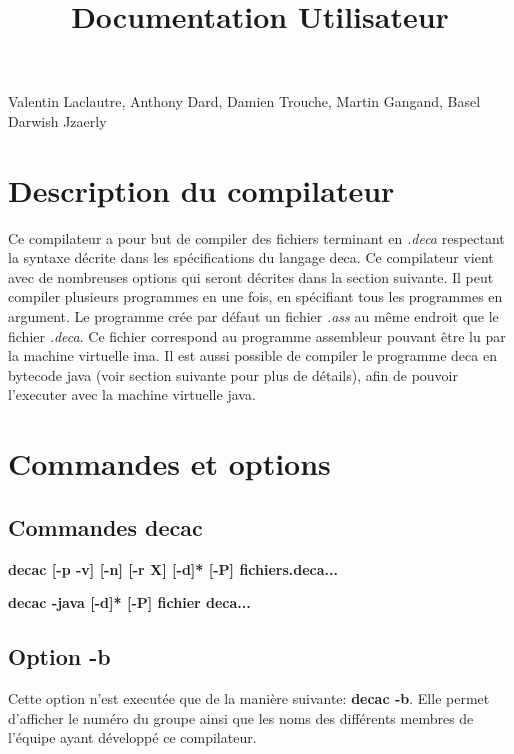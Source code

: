 \documentclass[12pt, a4paper, one side]{article}
\title{Documentation Utilisateur}
\author{}
\date{}
\begin{document}
    \maketitle

    \begin{center}
        Valentin Laclautre, Anthony Dard, Damien Trouche, Martin Gangand, Basel Darwish Jzaerly
    \end{center}

    \tableofcontents

    \newpage

    \section{Description du compilateur}

    Ce compilateur a pour but de compiler des fichiers terminant en \textit{.deca}
    respectant la syntaxe décrite dans les spécifications du langage deca. Ce compilateur
    vient avec de nombreuses options qui seront décrites dans la section suivante. Il
    peut compiler plusieurs programmes en une fois, en spécifiant tous les programmes
    en argument. Le programme crée par défaut un fichier \textit{.ass} au même endroit que
    le fichier \textit{.deca}. Ce fichier correspond au programme assembleur pouvant être lu
    par la machine virtuelle ima. Il est aussi possible de compiler le programme deca en
    bytecode java (voir section suivante pour plus de détails), afin de pouvoir l'executer
    avec la machine virtuelle java.

    \section{Commandes et options}

    \subsection{Commandes decac}

    \textbf{decac [-p \textbar -v] [-n] [-r X] [-d]* [-P] fichiers.deca... \textbar [-b]}

    \textbf{decac -java [-d]* [-P] fichier deca... \textbar  [-b]}

    \subsection{Option -b}

    Cette option n'est executée que de la manière suivante: \textbf{decac -b}. Elle permet
    d'afficher le numéro du groupe ainsi que les noms des différents membres de l'équipe
    ayant développé ce compilateur.
\end{document}
